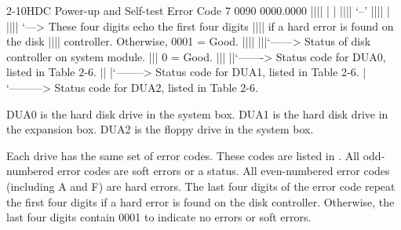 \begin{ttfig}{2-10}{HDC Power-up and Self-test Error Code}
7 0090 0000.0000
       |||| |  |
       |||| `--'
       ||||  |
       ||||  `---> These four digits echo the first four digits
       ||||        if a hard error is found on the disk
       ||||        controller. Otherwise, 0001 = Good.
       ||||
       |||`------> Status of disk controller on system module.
       |||         0 = Good.
       |||
       ||`-------> Status code for DUA0, listed in Table 2-6.
       ||
       |`--------> Status code for DUA1, listed in Table 2-6.
       |
       `---------> Status code for DUA2, listed in Table 2-6.

              DUA0 is the hard disk drive in the system box.
              DUA1 is the hard disk drive in the expansion box.
              DUA2 is the floppy drive in the system box.
\end{ttfig}

Each drive has the same set of error codes. These codes are listed in 
. All odd-numbered error codes are soft errors or a status. All 
even-numbered error codes (including A and F) are hard errors. The last four
digits of the error code repeat the first four digits if a hard error is found on
the disk controller. Otherwise, the last four digits contain 0001 to indicate
no errors or soft errors.

